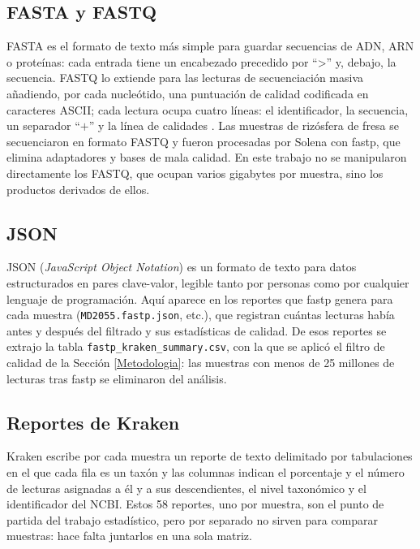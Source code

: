 \subsection{FASTA y FASTQ}
FASTA es el formato de texto más simple para guardar secuencias de ADN, ARN o proteínas: cada entrada
tiene un encabezado precedido por ``\textgreater'' y, debajo, la secuencia. FASTQ lo extiende para
las lecturas de secuenciación masiva añadiendo, por cada nucleótido, una puntuación de calidad
codificada en caracteres ASCII; cada lectura ocupa cuatro líneas: el identificador, la secuencia, un
separador ``$+$'' y la línea de calidades \citep{cock2010sanger}. Las muestras de rizósfera de fresa
se secuenciaron en formato FASTQ y fueron procesadas por Solena con fastp, que elimina adaptadores y
bases de mala calidad. En este trabajo no se manipularon directamente los FASTQ, que ocupan varios
gigabytes por muestra, sino los productos derivados de ellos.

\subsection{JSON}
JSON (\emph{JavaScript Object Notation}) es un formato de texto para datos estructurados en pares
clave-valor, legible tanto por personas como por cualquier lenguaje de programación. Aquí aparece
en los reportes que fastp genera para cada muestra (\texttt{MD2055.fastp.json}, etc.), que registran
cuántas lecturas había antes y después del filtrado y sus estadísticas de calidad. De esos reportes
se extrajo la tabla \texttt{fastp\_kraken\_summary.csv}, con la que se aplicó el filtro de calidad de
la Sección \ref{Metodologia}: las muestras con menos de 25 millones de lecturas tras fastp se
eliminaron del análisis.

\subsection{Reportes de Kraken}
Kraken escribe por cada muestra un reporte de texto delimitado por tabulaciones en el que cada fila
es un taxón y las columnas indican el porcentaje y el número de lecturas asignadas a él y a sus
descendientes, el nivel taxonómico y el identificador del NCBI. Estos 58 reportes, uno por muestra,
son el punto de partida del trabajo estadístico, pero por separado no sirven para comparar muestras:
hace falta juntarlos en una sola matriz.

